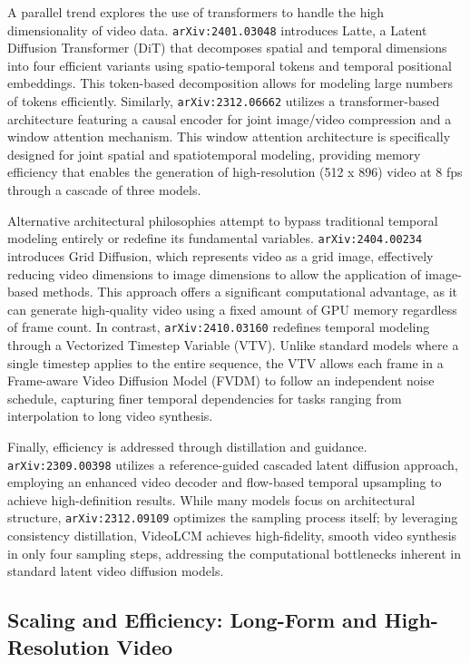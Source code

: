 \documentclass[11pt]{article}
\begin{document}
A parallel trend explores the use of transformers to handle the high dimensionality of video data. \texttt{arXiv:2401.03048} introduces Latte, a Latent Diffusion Transformer (DiT) that decomposes spatial and temporal dimensions into four efficient variants using spatio-temporal tokens and temporal positional embeddings. This token-based decomposition allows for modeling large numbers of tokens efficiently. Similarly, \texttt{arXiv:2312.06662} utilizes a transformer-based architecture featuring a causal encoder for joint image/video compression and a window attention mechanism. This window attention architecture is specifically designed for joint spatial and spatiotemporal modeling, providing memory efficiency that enables the generation of high-resolution (512 x 896) video at 8 fps through a cascade of three models.

Alternative architectural philosophies attempt to bypass traditional temporal modeling entirely or redefine its fundamental variables. \texttt{arXiv:2404.00234} introduces Grid Diffusion, which represents video as a grid image, effectively reducing video dimensions to image dimensions to allow the application of image-based methods. This approach offers a significant computational advantage, as it can generate high-quality video using a fixed amount of GPU memory regardless of frame count. In contrast, \texttt{arXiv:2410.03160} redefines temporal modeling through a Vectorized Timestep Variable (VTV). Unlike standard models where a single timestep applies to the entire sequence, the VTV allows each frame in a Frame-aware Video Diffusion Model (FVDM) to follow an independent noise schedule, capturing finer temporal dependencies for tasks ranging from interpolation to long video synthesis.

Finally, efficiency is addressed through distillation and guidance. \texttt{arXiv:2309.00398} utilizes a reference-guided cascaded latent diffusion approach, employing an enhanced video decoder and flow-based temporal upsampling to achieve high-definition results. While many models focus on architectural structure, \texttt{arXiv:2312.09109} optimizes the sampling process itself; by leveraging consistency distillation, VideoLCM achieves high-fidelity, smooth video synthesis in only four sampling steps, addressing the computational bottlenecks inherent in standard latent video diffusion models.

\subsection{Scaling and Efficiency: Long-Form and High-Resolution Video}
\end{document}
